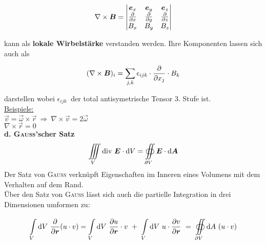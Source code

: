 \begin{equation*}
\nabla\times\bm{B}=\begin{vmatrix}
\bm{e}_x & \bm{e}_y & \bm{e}_z \\
\frac{\partial{}}{\partial{x}} & \frac{\partial{}}{\partial{y}} & \frac{\partial{}}{\partial{z}}\\
B_x & B_y & B_z
\end{vmatrix}
\end{equation*}

kann als \textbf{lokale Wirbelstärke} verstanden werden. Ihre Komponenten lassen sich auch als

\begin{equation*}
(\nabla\times\bm{B})_i=\sum\limits_{j,k}\epsilon_{ijk}\cdot\frac{\partial{}}{\partial{x_j}}\cdot B_k
\end{equation*}

darstellen wobei $\epsilon_{ijk}\ $ der total antisymetrische Tensor 3. Stufe ist.\\
\linebreak
\underline{Beispiele:}\\
\linebreak
$\vec{v}=\vec{\omega}\times\vec{r} \ \Rightarrow \ \nabla\times\vec{v}=2\vec{\omega}$\\
$\nabla\times\vec{r}=0$\\
\linebreak\linebreak
\textbf{d. \textsc{Gauss}'scher Satz}\\
\begin{equation*}
\iiint\limits_V\text{div }\bm{E}\cdot\mathrm{d} V=\oiint\limits_{\partial V}\bm{E}\cdot\mathrm{d} \bm{A}
\end{equation*}
Der Satz von \textsc{Gauss} verknüpft Eigenschaften im Inneren eines Volumens mit dem Verhalten auf dem Rand.\\

Über den Satz von \textsc{Gauss} lässt sich auch die partielle Integration in drei Dimensionen umformen zu:

\begin{equation*}
\int\limits_{{V}}^{{}}\mathrm{d}{V} \ \frac{\partial{}}{\partial{\bm{r}}} (u\cdot v) = \int\limits_{{V}}^{{}}\mathrm{d}{V} \  \frac{\partial{u}}{\partial{\bm{r}}}\cdot v \ + \ \int\limits_{{V}}^{{}}\mathrm{d}{V} \  u \cdot\frac{\partial{v}}{\partial{\bm{r}}} \ = \ \oiint\limits_{{\partial V}}^{{}}\mathrm{d}{A} \  (u\cdot v)
\end{equation*}

